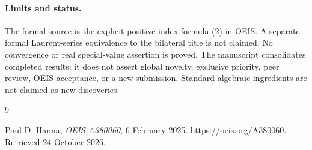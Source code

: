 \documentclass[11pt,a4paper]{article}
\theoremstyle{remark}
\begin{document}
\paragraph{Limits and status.}
The formal source is the explicit positive-index formula (2) in OEIS. A separate formal Laurent-series equivalence to the bilateral title is not claimed. No convergence or real special-value assertion is proved.
The manuscript consolidates completed results; it does not assert global
novelty, exclusive priority, peer review, OEIS acceptance, or a new submission.
Standard algebraic ingredients are not claimed as new discoveries.

\begin{thebibliography}{9}
\raggedright
{}
Paul D. Hanna, \emph{OEIS A380060}, 6 February 2025.
\url{https://oeis.org/A380060}. Retrieved 24 October 2026.
\end{thebibliography}
\end{document}
